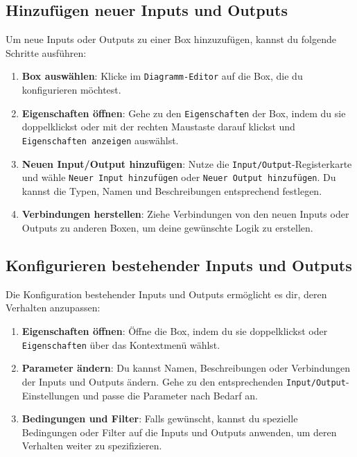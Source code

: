 \subsection{Hinzufügen neuer Inputs und Outputs}
Um neue Inputs oder Outputs zu einer Box hinzuzufügen, kannst du folgende Schritte ausführen:
\begin{enumerate}
    \item \textbf{Box auswählen}: Klicke im \texttt{Diagramm-Editor} auf die Box, die du konfigurieren möchtest.
    \item \textbf{Eigenschaften öffnen}: Gehe zu den \texttt{Eigenschaften} der Box, indem du sie doppelklickst oder mit der rechten Maustaste darauf klickst und \texttt{Eigenschaften anzeigen} auswählst.
    \item \textbf{Neuen Input/Output hinzufügen}: Nutze die \texttt{Input/Output}-Registerkarte und wähle \texttt{Neuer Input hinzufügen} oder \texttt{Neuer Output hinzufügen}. Du kannst die Typen, Namen und Beschreibungen entsprechend festlegen.
    \item \textbf{Verbindungen herstellen}: Ziehe Verbindungen von den neuen Inputs oder Outputs zu anderen Boxen, um deine gewünschte Logik zu erstellen.
\end{enumerate}

\subsection{Konfigurieren bestehender Inputs und Outputs}
Die Konfiguration bestehender Inputs und Outputs ermöglicht es dir, deren Verhalten anzupassen:
\begin{enumerate}
    \item \textbf{Eigenschaften öffnen}: Öffne die Box, indem du sie doppelklickst oder \texttt{Eigenschaften} über das Kontextmenü wählst.
    \item \textbf{Parameter ändern}: Du kannst Namen, Beschreibungen oder Verbindungen der Inputs und Outputs ändern. Gehe zu den entsprechenden \texttt{Input/Output}-Einstellungen und passe die Parameter nach Bedarf an.
    \item \textbf{Bedingungen und Filter}: Falls gewünscht, kannst du spezielle Bedingungen oder Filter auf die Inputs und Outputs anwenden, um deren Verhalten weiter zu spezifizieren.
\end{enumerate}

